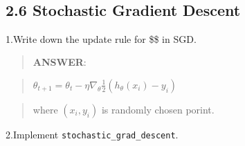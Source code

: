 \documentclass{article}
\begin{document}
    \begin{center}
    \end{center}
    { \hspace*{\fill} \\}
    
    \subsection{2.6 Stochastic Gradient
Descent}\label{stochastic-gradient-descent}

    1.Write down the update rule for \$\theta \$ in SGD.

    \begin{quote}
\textbf{ANSWER}:
\end{quote}

\begin{quote}
\(\theta_{t+1}=\theta_t - \eta\nabla_{\theta}\frac{1}{2}(h_{\theta}(x_i)-y_i)\)
\end{quote}

\begin{quote}
where \((x_i,y_i)\) is randomly chosen porint.
\end{quote}

    2.Implement \texttt{stochastic\_grad\_descent}.
\end{document}
